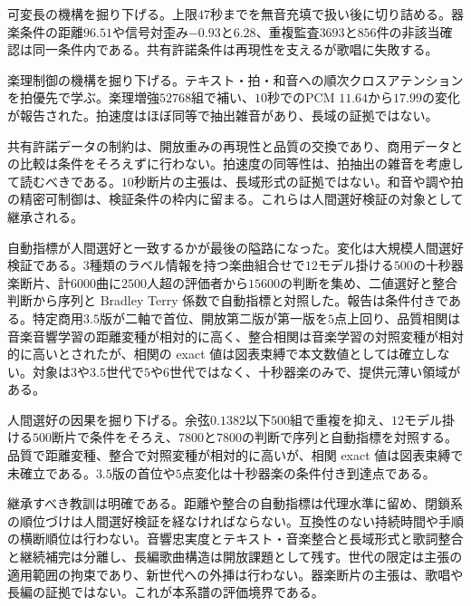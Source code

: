 \documentclass[lualatex,a4paper,10pt]{jlreq}
\begin{document}
可変長の機構を掘り下げる。上限$47$秒までを無音充填で扱い後に切り詰める\autocite{btd068}。器楽条件の距離$96.51$や信号対歪み$-0.93$と$6.28$、重複監査$3693$と$856$件の非該当確認は同一条件内である\autocite{btd068}。共有許諾条件は再現性を支えるが歌唱に失敗する\autocite{btd068}。

楽理制御の機構を掘り下げる。テキスト・拍・和音への順次クロスアテンションを拍優先で学ぶ\autocite{btd069}。楽理増強$52768$組で補い、$10$秒でのPCM $11.64$から$17.99$の変化が報告された\autocite{btd069}。拍速度はほぼ同等で抽出雑音があり、長域の証拠ではない\autocite{btd069}。

共有許諾データの制約は、開放重みの再現性と品質の交換であり、商用データとの比較は条件をそろえずに行わない\autocite{btd068}。拍速度の同等性は、拍抽出の雑音を考慮して読むべきである\autocite{btd069}。$10$秒断片の主張は、長域形式の証拠ではない\autocite{btd069}。和音や調や拍の精密可制御は、検証条件の枠内に留まる\autocite{btd069}。これらは人間選好検証の対象として継承される\autocite{btd069,btd136}。

自動指標が人間選好と一致するかが最後の隘路になった\autocite{btd136}。変化は大規模人間選好検証である\autocite{btd136}。3種類のラベル情報を持つ楽曲組合せで$12$モデル掛ける$500$の十秒器楽断片、計$6000$曲に$2500$人超の評価者から$15600$の判断を集め、二値選好と整合判断から序列と Bradley Terry 係数で自動指標と対照した\autocite{btd136}。報告は条件付きである。特定商用$3.5$版が二軸で首位、開放第二版が第一版を$5$点上回り、品質相関は音楽音響学習の距離変種が相対的に高く、整合相関は音楽学習の対照変種が相対的に高いとされたが、相関の exact 値は図表束縛で本文数値としては確立しない\autocite{btd136}。対象は$3$や$3.5$世代で$5$や$6$世代ではなく、十秒器楽のみで、提供元薄い領域がある\autocite{btd136}。

人間選好の因果を掘り下げる。余弦$0.1382$以下$500$組で重複を抑え、$12$モデル掛ける$500$断片で条件をそろえ、$7800$と$7800$の判断で序列と自動指標を対照する\autocite{btd136}。品質で距離変種、整合で対照変種が相対的に高いが、相関 exact 値は図表束縛で未確立である\autocite{btd136}。$3.5$版の首位や$5$点変化は十秒器楽の条件付き到達点である\autocite{btd136}。

継承すべき教訓は明確である。距離や整合の自動指標は代理水準に留め、閉鎖系の順位づけは人間選好検証を経なければならない\autocite{btd136}。互換性のない持続時間や手順の横断順位は行わない\autocite{btd136}。音響忠実度とテキスト・音楽整合と長域形式と歌詞整合と継続補完は分離し、長編歌曲構造は開放課題として残す\autocite{btd136}。世代の限定は主張の適用範囲の拘束であり、新世代への外挿は行わない\autocite{btd136}。器楽断片の主張は、歌唱や長編の証拠ではない\autocite{btd136}。これが本系譜の評価境界である\autocite{btd136}。
\end{document}
